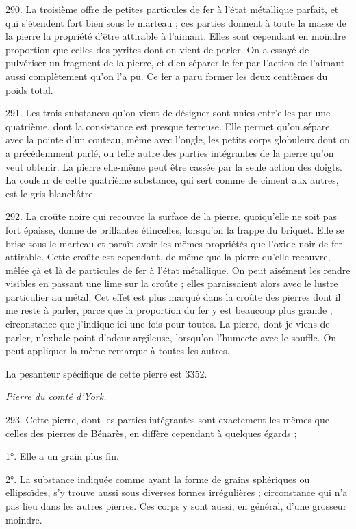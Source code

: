 \documentclass[a4paper, 11pt, oneside, polutonikogreek, french]{article}
\begin{document}
290. La troisième offre de petites particules de fer à l'état métallique parfait, et qui s'étendent fort bien sous le marteau ; ces parties donnent à toute la masse de la pierre la propriété d'être attirable à l'aimant. Elles sont cependant en moindre proportion que celles des pyrites dont on vient de parler. On a essayé de pulvériser un fragment de la pierre, et d'en séparer le fer par l'action de l'aimant aussi complètement qu'on l'a pu. Ce fer a paru former les deux centièmes du poids total.

291. Les trois substances qu'on vient de désigner sont unies entr'elles par une quatrième, dont la consistance est presque terreuse. Elle permet qu'on sépare, avec la pointe d'un couteau, même avec l'ongle, les petits corps globuleux dont on a précédemment parlé, ou telle autre des parties intégrantes de la pierre qu'on veut obtenir. La pierre elle-même peut être cassée par la seule action des doigts. La couleur de cette quatrième substance, qui sert comme de ciment aux autres, est le gris blanchâtre.

292. La croûte noire qui recouvre la surface de la pierre, quoiqu'elle ne soit pas fort épaisse, donne de brillantes étincelles, lorsqu'on la frappe du briquet. Elle se brise sous le marteau et paraît avoir les mêmes propriétés que l'oxide noir de fer attirable. Cette croûte est cependant, de même que la pierre qu'elle recouvre, mêlée çà et là de particules de fer à l'état métallique. On peut aisément les rendre visibles en passant une lime sur la croûte ; elles paraissaient alors avec le lustre particulier au métal. Cet effet est plus marqué dans la croûte des pierres dont il me reste à parler, parce que la proportion du fer y est beaucoup plus grande ; circonstance que j'indique ici une fois pour toutes. La pierre, dont je viens de parler, n'exhale point d'odeur argileuse, lorsqu'on l'humecte avec le souffle. On peut appliquer la même remarque à toutes les autres.

La pesanteur spécifique de cette pierre est 3352.

\emph{Pierre du comté d'York.}

293. Cette pierre, dont les parties intégrantes sont exactement les mêmes que celles des pierres de Bénarès, en diffère cependant à quelques égards ;

1°. Elle a un grain plus fin.

2°. La substance indiquée comme ayant la forme de grains sphériques ou ellipsoïdes, s'y trouve aussi sous diverses formes irrégulières ; circonstance qui n'a pas lieu dans les autres pierres. Ces corps y sont aussi, en général, d'une grosseur moindre.
\end{document}
